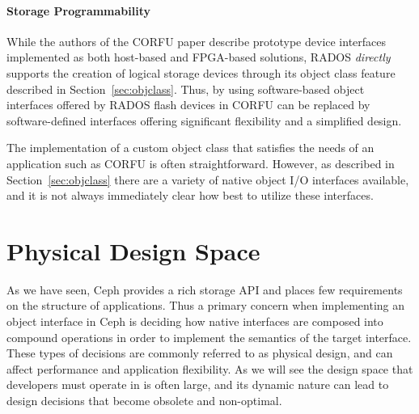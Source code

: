 \documentclass[10pt,twocolumn]{article}
\begin{document}
\paragraph*{Storage Programmability}
While the authors of the CORFU paper describe prototype device interfaces
implemented as both host-based and FPGA-based solutions, RADOS \emph{directly} supports
the creation of logical storage devices through its object class feature
described in Section~\ref{sec:objclass}. Thus, by using
software-based object interfaces offered by RADOS flash devices in CORFU can be
replaced by software-defined interfaces offering significant flexibility and a
simplified design.

The implementation of a custom object class that satisfies the needs of an
application such as CORFU is often straightforward. However, as described in
Section~\ref{sec:objclass} there are a variety of native object I/O interfaces
available, and it is not always immediately clear how best to utilize these
interfaces.

\section{Physical Design Space}
\label{sec:pd}

As we have seen, Ceph provides a rich storage API and places few requirements
on the structure of applications. Thus a primary concern when implementing an
object interface in Ceph is deciding how native interfaces are composed into
compound operations in order to implement the semantics of the target
interface. These types of decisions are commonly referred to as
physical design, and can affect performance and application flexibility.
As we will see the design space that developers must operate in is often
large, and its dynamic nature can lead to design decisions that become
obsolete and non-optimal.
\end{document}

